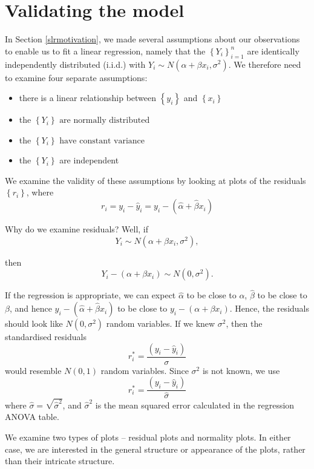 \documentclass[12pt,a4paper,openany,twoside]{report}
\theoremstyle{definition}
\theoremstyle{remark}
\theoremstyle{plain}
\theoremstyle{definition}
\theoremstyle{definition}
\theoremstyle{definition}
\theoremstyle{remark}
\begin{document}
\hypertarget{slrvalidate}{%
\section{Validating the model}\label{slrvalidate}}

In Section \ref{slrmotivation}, we made several assumptions about our observations
to enable us to fit a linear
regression, namely that the \(\left\{ Y_{i} \right\}_{i=1}^{n}\) are identically
independently distributed (i.i.d.) with
\(Y_{i}\sim N(\alpha + \beta x_{i},\sigma^{2})\). We therefore need to
examine four separate assumptions:

\begin{itemize}
\item
  there is a linear relationship between \(\left\{ y_{i} \right\}\) and
  \(\left\{ x_{i} \right\}\)
\item
  the \(\left\{ Y_{i} \right\}\text{\ are\ normally\ distributed}\)
\item
  the \(\left\{ Y_{i} \right\}\text{\ have\ constant\ variance}\)
\item
  the \(\left\{ Y_{i} \right\}\) are independent
\end{itemize}

We examine the validity of these assumptions by looking at plots of the
residuals \(\left\{ r_{i} \right\}\), where
\[r_{i} = y_{i} - {\hat{y}}_{i} = y_{i} - (\hat{\alpha} + \hat{\beta}x_{i})\]

Why do we examine residuals? Well, if
\[Y_{i}\sim N(\alpha + \beta x_{i},\sigma^{2}),\]

then
\[Y_{i} - (\alpha + \beta x_{i})\sim N(0,\sigma^{2}).\]

If the regression is appropriate, we can expect \(\hat{\alpha}\) to be
close to \(\alpha\), \(\hat{\beta}\) to be close to \(\beta\), and hence
\(y_{i} - (\hat{\alpha} + \hat{\beta}x_{i})\) to be close to
\(y_{i} - (\alpha + \beta x_{i})\). Hence, the residuals should look
like \(N\left(0,\sigma^{2} \right)\) random variables. If we knew
\(\sigma^{2}\), then the standardised residuals
\[r_{i}^{*} = \frac{(y_{i} - {\hat{y}}_{i})}{\sigma}\]
would resemble \(N(0,1)\) random variables.
Since \(\sigma^{2}\) is not known, we use
\[r_{i}^{*} = \frac{(y_{i} - {\hat{y}}_{i})}{\hat{\sigma}}\]
where \(\hat{\sigma} = \sqrt{\hat{\sigma}^{2}}\), and \({\hat{\sigma}}^{2}\) is the mean squared error calculated in the
regression ANOVA table.

We examine two types of plots -- residual plots and normality plots. In
either case, we are interested in the general structure or appearance of
the plots, rather than their intricate structure.
\end{document}
